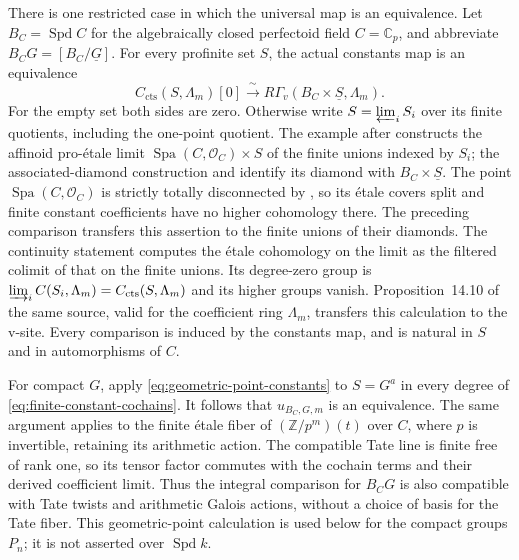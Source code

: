\documentclass[11pt]{article}
\numberwithin{equation}{section}
\theoremstyle{definition}
\theoremstyle{remark}
\newcommand{\Z}{\mathbb Z}
\newcommand{\C}{\mathbb C}
\newcommand{\cO}{\mathcal O}
\newcommand{\cts}{\mathrm{cts}}
\DeclareMathOperator{\Spd}{Spd}
\begin{document}
There is one restricted case in which the universal map is an
equivalence.  Let $B_C=\Spd C$ for the algebraically closed perfectoid
field $C=\C_p$, and abbreviate $B_CG=[B_C/\underline G]$.
For every profinite set $S$, the actual constants map
is an equivalence
\begin{equation}\label{eq:geometric-point-constants}
 C_{\cts}(S,\Lambda_m)[0]\xrightarrow{\ \sim\ }
       R\Gamma_v(B_C\times\underline S,\Lambda_m).
\end{equation}
For the empty set both sides are zero.  Otherwise write $S=\varprojlim_i S_i$
over its finite quotients, including the one-point quotient.  The example
after \cite[Definition~7.8]{ScholzeDiamonds} constructs the affinoid
pro-\'etale limit $\operatorname{Spa}(C,\cO_C)\times S$ of the finite
unions indexed by $S_i$; the associated-diamond construction and
\cite[Example~11.12 and Lemma~15.2]{ScholzeDiamonds} identify its
diamond with $B_C\times\underline S$.
The point $\operatorname{Spa}(C,\cO_C)$ is strictly totally disconnected
by \cite[Definition~7.15 and Proposition~7.16]{ScholzeDiamonds}, so its
\'etale covers split and finite constant coefficients have no higher
cohomology there.  The preceding \cite[Lemma~15.6]{ScholzeDiamonds}
comparison transfers this assertion to the finite unions of their
diamonds.  The continuity statement
\cite[Proposition~14.9]{ScholzeDiamonds} computes the \'etale
cohomology on the limit as the filtered colimit of that on the finite
unions.  Its degree-zero group is
$\varinjlim_i C(S_i,\Lambda_m)=C_{\cts}(S,\Lambda_m)$ and its higher
groups vanish.  Proposition~14.10 of the same source, valid for the
coefficient ring $\Lambda_m$, transfers this calculation to the v-site.
Every comparison is induced by the constants map, and is natural in
$S$ and in automorphisms of $C$.

For compact $G$, apply \eqref{eq:geometric-point-constants} to
$S=G^a$ in every degree of \eqref{eq:finite-constant-cochains}.
It follows that $u_{B_C,G,m}$ is an equivalence.  The same argument
applies to the finite \'etale fiber of $(\Z/p^m)(t)$ over $C$,
where $p$ is invertible, retaining its arithmetic action.  The
compatible Tate line is finite free of rank one, so its tensor factor
commutes with the cochain terms and their derived coefficient limit.
Thus the integral comparison for
$B_CG$ is also compatible with Tate twists and arithmetic Galois
actions, without a choice of basis for the Tate fiber.  This
geometric-point calculation is used below for the compact groups
$P_n$; it is not asserted over $\Spd k$.
\end{document}
